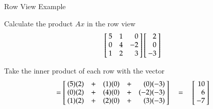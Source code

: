 \documentclass[10pt]{beamer}
\begin{document}
\begin{frame}{Row View Example}

\begin{example}
Calculate the product $Ax$ in the row view
\begin{equation*}
    \left[\negthickspace
          \begin{array}{rrr}  5 &  1  &  0    \\
                              0 &  4  & -2     \\
                              1 &  2  &  3    \end{array}\negthickspace\right]
    \left[\negthickspace
          \begin{array}{r}  2 \\  0  \\  -3  \end{array}\negthickspace\right]
\end{equation*}
\end{example}

Take the inner product of each row with the vector
\begin{equation*}
    \hfill
    = \left[\negthickspace
          \begin{array}{rcrcrcr}
                     (5)(2)  & + & (1)(0) & + & (0)(-3)   \\
                     (0)(2) & + & (4)(0) & + & (-2)(-3)  \\
                     (1)(2)  & + & (2)(0) & + & (3)(-3)   \end{array}\negthickspace\right]
    \quad=\quad
    \left[\negthickspace
          \begin{array}{r}  10 \\  6  \\ -7 \end{array}\negthickspace\right]
\end{equation*}

\end{frame}
\end{document}
